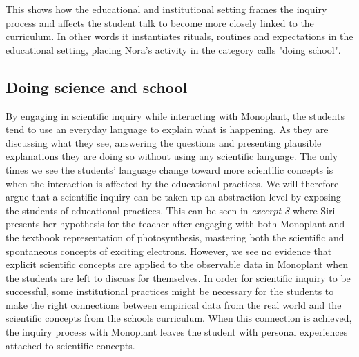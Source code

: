 This shows how the educational and institutional setting frames the inquiry process and affects the student talk to become more closely linked to the curriculum. In other words it instantiates rituals, routines and expectations in the educational setting, placing Nora's activity in the category \citet{jimenez2000doing} calls "doing school". 


\subsection{Doing science and school}
By engaging in scientific inquiry while interacting with Monoplant, the students tend to use an everyday language to explain what is happening. As they are discussing what they see, answering the questions and presenting plausible explanations they are doing so without using any scientific language. The only times we see the students' language change toward more scientific concepts is when the interaction is affected by the educational practices. We will therefore argue that a scientific inquiry can be taken up an abstraction level by exposing the students of educational practices. This can be seen in \emph{excerpt 8} where Siri presents her hypothesis for the teacher after engaging with both Monoplant and the textbook representation of photosynthesis, mastering both the scientific and spontaneous concepts of exciting electrons. However, we see no evidence that explicit scientific concepts are applied to the observable data in Monoplant when the students are left to discuss for themselves. 
In order for scientific inquiry to be successful, some institutional practices might be necessary for the students to make the right connections between empirical data from the real world and the scientific concepts from the schools curriculum. When this connection is achieved, the inquiry process with Monoplant leaves the student with personal experiences attached to scientific concepts. 

 


